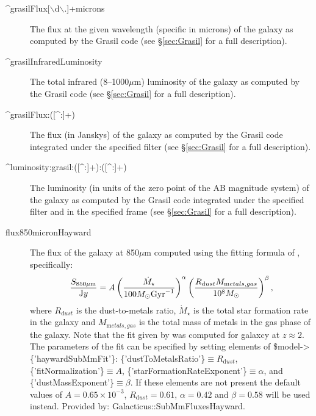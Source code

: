 \begin{description}
 \item[{\normalfont \ttfamily \textasciicircum grasilFlux[$\backslash$d$\backslash$.]+microns}] The flux at the given wavelength (specific in microns) of the galaxy as computed by the {\normalfont \ttfamily Grasil} code (see \S\ref{sec:Grasil} for a full description).
 \item[{\normalfont \ttfamily \textasciicircum grasilInfraredLuminosity}] The total infrared (8--1000$\mu$m) luminosity of the galaxy as computed by the {\normalfont \ttfamily Grasil} code (see \S\ref{sec:Grasil} for a full description).
 \item[{\normalfont \ttfamily \textasciicircum grasilFlux:([\textasciicircum :]+)}] The flux (in Janskys) of the galaxy as computed by the {\normalfont \ttfamily Grasil} code integrated under the specified filter (see \S\ref{sec:Grasil} for a full description).
 \item[{\normalfont \ttfamily \textasciicircum luminosity:grasil:([\textasciicircum :]+):([\textasciicircum :]+)}] The luminosity (in units of the zero point of the AB magnitude system) of the galaxy as computed by the {\normalfont \ttfamily Grasil} code integrated under the specified filter and in the specified frame (see \S\ref{sec:Grasil} for a full description).
 \item[{\normalfont \ttfamily flux850micronHayward}] The flux of the galaxy at 850$\mu$m computed using the fitting formula of \cite{hayward_what_2010}, specifically:
\begin{equation}
 {S_{850\mu{\mathrm m}} \over {\mathrm Jy}} = A \left({\dot{M}_\star \over 100 M_\odot \hbox{Gyr}^{-1}}\right)^\alpha \left({R_{\mathrm dust} M_{\mathrm metals,gas} \over 10^8 M_\odot}\right)^\beta,
\end{equation}
where $R_{\mathrm dust}$ is the dust-to-metals ratio, $\dot{M}_\star$ is the total star formation rate in the galaxy and $M_{\mathrm metals,gas}$ is the total mass of metals in the gas phase of the galaxy. Note that the fit given by \cite{hayward_what_2010} was computed for galaxcy at $z\approx 2$. The parameters of the fit can be specified by setting elements of {\normalfont \ttfamily \$model-\textgreater\{'haywardSubMmFit'\}}: {\normalfont \ttfamily \{'dustToMetalsRatio'\}}$\equiv R_{\mathrm dust}$, {\normalfont \ttfamily \{'fitNormalization'\}}$\equiv A$, {\normalfont \ttfamily \{'starFormationRateExponent'\}}$\equiv \alpha$, and {\normalfont \ttfamily \{'dustMassExponent'\}}$\equiv \beta$. If these elements are not present the default values of $A=0.65\times 10^{-3}$, $R_{\mathrm dust}=0.61$, $\alpha=0.42$ and $\beta = 0.58$ \cite{hayward_what_2010} will be used instead. Provided by: {\normalfont \ttfamily Galacticus::SubMmFluxesHayward}.

\end{description}
